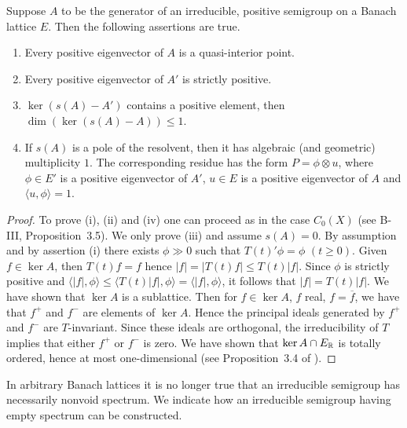 \begin{proposition}\label{prop:c3-3.5}
	
	Suppose $A$ to be the generator of an irreducible, positive semigroup on a Banach lattice $E$.
	Then the following assertions are true.
	\begin{enumerate}[\upshape (i)]
	\item 
	Every positive eigenvector of $A$ is a quasi-interior point.
	
	\item 
	Every positive eigenvector of $A'$ is strictly positive.
	
	\item 
	$\ker(s(A) - A')$ contains a positive element, then $\dim(\ker(s(A) - A)) \leq 1$.
	
	\item If $s(A)$ is a pole of the resolvent, then it has algebraic (and geometric) multiplicity $1$.
	The corresponding residue has the form $P = \phi\otimes u$, where $\phi \in E'$ is a positive eigenvector of $A'$, $u \in E$ is a positive eigenvector of $A$ and $\langle u,\phi \rangle = 1$.
	\end{enumerate}
\end{proposition}
\begin{proof}
    To prove (i), (ii) and (iv) one can proceed as in the case $C_{0}(X)$ (see B-III, Proposition~3.5).
    We only prove (iii) and assume $s(A) = 0$.
    By assumption and by assertion (i) there exists $\phi \gg 0$ such that $T(t)'\phi = \phi$ $(t\geq0)$.
    Given $f \in \ker A$, then $T(t)f = f$ hence $|f| = |T(t)f| \leq T(t)|f|$.
    Since $\phi$ is strictly positive and $\langle|f|,\phi\rangle \leq \langle T(t)|f|,\phi\rangle = \langle|f|,\phi\rangle$, it follows that $|f| = T(t)|f|$.
    We have shown that $\ker A$ is a sublattice.
    Then for $f \in \ker A$, $f$ real, \ie  $f = \overline{f}$, we have that $f^{+}$ and $f^{-}$ are elements of $\ker A$.
    Hence the principal ideals generated by $f^{+}$ and $f^{-}$ are $T$-invariant.
    Since these ideals are orthogonal, the irreducibility of $T$ implies that either $f^{+}$ or $f^{-}$ is zero.
    We have shown that $\ker A \cap E_{\mathbb{R} }$ is totally ordered, hence at most one-dimensional (see Proposition~3.4 of \citet{schaefer:1974}).
\end{proof}
In arbitrary Banach lattices it is no longer true that an irreducible semigroup has necessarily nonvoid spectrum.
We indicate how an irreducible semigroup having empty spectrum can be constructed.

